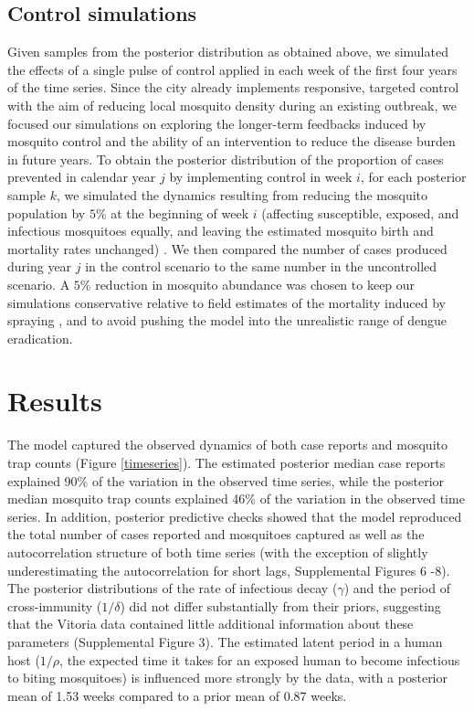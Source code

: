 \documentclass[10pt,letterpaper]{article}
\begin{document}
\subsection*{Control simulations}

Given samples from the posterior distribution as obtained above, we simulated the effects of a single pulse of control applied in each week of the first four years of the time series.
Since the city already implements responsive, targeted control with the aim of reducing local mosquito density during an existing outbreak, we focused our simulations on exploring the longer-term feedbacks induced by mosquito control and the ability of an intervention to reduce the disease burden in future years.
To obtain the posterior distribution of the proportion of cases prevented in calendar year $j$ by implementing control in week $i$, for each posterior sample $k$, we simulated the dynamics resulting from reducing the mosquito population by $5\%$ at the beginning of week $i$ (affecting susceptible, exposed, and infectious mosquitoes equally, and leaving the estimated mosquito birth and mortality rates unchanged) .
We then compared the number of cases produced during year $j$ in the control scenario to the same number in the uncontrolled scenario.
A $5\%$ reduction in mosquito abundance was chosen to keep our simulations conservative relative to field estimates of the mortality induced by spraying \cite{Esu2010}, and to avoid pushing the model into the unrealistic range of dengue eradication.

\section*{Results}

The model captured the observed dynamics of both case reports and mosquito trap counts (Figure \ref{timeseries}).
The estimated posterior median case reports explained 90\% of the variation in the observed time series, while the posterior median mosquito trap counts explained 46\% of the variation in the observed time series. 
In addition, posterior predictive checks showed that the model reproduced the total number of cases reported and mosquitoes captured as well as the autocorrelation structure of both time series (with the exception of slightly underestimating the autocorrelation for short lags, Supplemental Figures 6 -8).
The posterior distributions of the rate of infectious decay ($\gamma$) and the period of cross-immunity ($1/\delta$) did not differ substantially from their priors, suggesting that the Vitoria data contained little additional information about these parameters (Supplemental Figure 3).
The estimated latent period in a human host ($1/\rho$, the expected time it takes for an exposed human to become infectious to biting mosquitoes) is influenced more strongly by the data, with a posterior mean of 1.53 weeks compared to a prior mean of 0.87 weeks.
\end{document}

